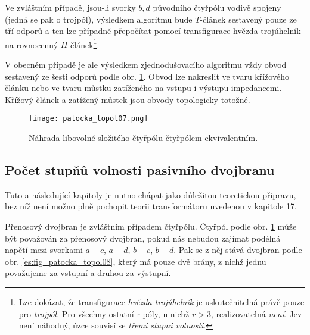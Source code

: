       Ve zvláštním případě, jsou-li svorky \(b, d\) původního čtyřpólu vodivě spojeny (jedná se pak 
      o trojpól), výsledkem algoritmu bude \(T\)-článek sestavený pouze ze tří odporů a ten lze 
      případně přepočítat pomocí transfigurace hvězda-trojúhelník na rovnocenný 
      \(\Pi\)-článek\footnote{Lze dokázat, že transfigurace \emph{hvězda-trojúhelník} je 
      uskutečnitelná právě pouze pro \emph{trojpól}. Pro všechny ostatní r-póly, u nichž \(r > 3\), 
      realizovatelná \emph{není}. Jev není náhodný, úzce souvisí se \emph{třemi stupni volnosti}.}.
      
      V obecném případě je ale výsledkem zjednodušovacího algoritmu vždy obvod sestavený ze šesti 
      odporů podle obr. \ref{es:fig_patocka_topol07}. Obvod lze nakreslit ve tvaru křížového článku 
      nebo ve tvaru můstku zatíženého na vstupu i výstupu impedancemi. Křížový článek a zatížený 
      můstek jsou obvody topologicky totožné.
      \begin{figure}[ht!]
        \centering  
        \texttt{[image: patocka\_topol07.png]}
        \caption{Náhrada libovolné složitého čtyřpólu čtyřpólem ekvivalentním.
                \cite[s.~48]{Patocka4}} 
        \label{es:fig_patocka_topol07}
      \end{figure}
      
    \subsection{Počet stupňů volnosti pasivního dvojbranu}\label{teo:IchapIIsecIsubVI}
      Tuto a následující kapitoly je nutno chápat jako důležitou teoretickou připravu, bez níž není 
      možno plně pochopit teorii transformátoru uvedenou v kapitole 17.
      
      Přenosový dvojbran je zvláštním případem čtyřpólu. Čtyř\-pól podle obr. 
      \ref{es:fig_patocka_topol07} může být považován za přenosový dvojbran, pokud nás nebudou 
      zajímat podélná napětí mezi svorkami \(a-c\), \(a-d\), \(b-c\), \(b-d\). Pak se z něj stává 
      dvojbran podle obr. \ref{es:fig_patocka_topol08}, který má pouze dvě brány, z nichž jednu 
      považujeme za vstupní a druhou za výstupní.
      
